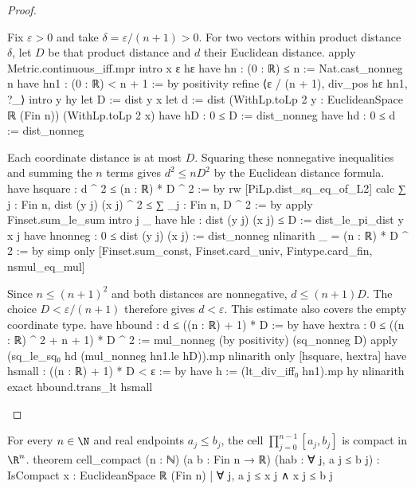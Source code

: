 \begin{proof}
  \begin{lean}{Fix $\varepsilon>0$ and take $\delta=\varepsilon/(n+1)>0$. For two vectors within product distance $\delta$, let $D$ be that product distance and $d$ their Euclidean distance.}
    apply Metric.continuous_iff.mpr
    intro x ε hε
    have hn : (0 : ℝ) ≤ n := Nat.cast_nonneg n
    have hn1 : (0 : ℝ) < n + 1 := by positivity
    refine ⟨ε / (n + 1), div_pos hε hn1, ?_⟩
    intro y hy
    let D := dist y x
    let d := dist (WithLp.toLp 2 y : EuclideanSpace ℝ (Fin n)) (WithLp.toLp 2 x)
    have hD : 0 ≤ D := dist_nonneg
    have hd : 0 ≤ d := dist_nonneg
  \end{lean}

  \begin{lean}{Each coordinate distance is at most $D$. Squaring these nonnegative inequalities and summing the $n$ terms gives $d^2\le nD^2$ by the Euclidean distance formula.}
    have hsquare : d ^ 2 ≤ (n : ℝ) * D ^ 2 := by
      rw [PiLp.dist_sq_eq_of_L2]
      calc
        ∑ j : Fin n, dist (y j) (x j) ^ 2 ≤ ∑ _j : Fin n, D ^ 2 := by
          apply Finset.sum_le_sum
          intro j _
          have hle : dist (y j) (x j) ≤ D := dist_le_pi_dist y x j
          have hnonneg : 0 ≤ dist (y j) (x j) := dist_nonneg
          nlinarith
        _ = (n : ℝ) * D ^ 2 := by simp only [Finset.sum_const, Finset.card_univ,
            Fintype.card_fin, nsmul_eq_mul]
  \end{lean}

  \begin{lean}{Since $n\le(n+1)^2$ and both distances are nonnegative, $d\le(n+1)D$. The choice $D<\varepsilon/(n+1)$ therefore gives $d<\varepsilon$. This estimate also covers the empty coordinate type.}
    have hbound : d ≤ ((n : ℝ) + 1) * D := by
      have hextra : 0 ≤ ((n : ℝ) ^ 2 + n + 1) * D ^ 2 :=
        mul_nonneg (by positivity) (sq_nonneg D)
      apply (sq_le_sq₀ hd (mul_nonneg hn1.le hD)).mp
      nlinarith only [hsquare, hextra]
    have hsmall : ((n : ℝ) + 1) * D < ε := by
      have h := (lt_div_iff₀ hn1).mp hy
      nlinarith
    exact hbound.trans_lt hsmall
  \end{lean}

\end{proof}

\begin{theorem} \label{an1:thm:k-cell-is-compact}
  \begin{lean}{For every $n\in\N$ and real endpoints $a_j\leq b_j$, the cell $\prod_{j=0}^{n-1}[a_j,b_j]$ is compact in $\R^{n}$.}
    theorem cell_compact (n : ℕ) (a b : Fin n → ℝ) (hab : ∀ j, a j ≤ b j) :
        IsCompact {x : EuclideanSpace ℝ (Fin n) | ∀ j, a j ≤ x j ∧ x j ≤ b j}
  \end{lean}
\end{theorem}

